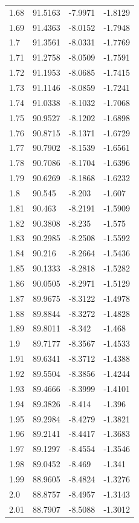 \begin{tabular}{llll}
1.68 & 91.5163 & -7.9971 & -1.8129 \\
1.69 & 91.4363 & -8.0152 & -1.7948 \\
1.7 & 91.3561 & -8.0331 & -1.7769 \\
1.71 & 91.2758 & -8.0509 & -1.7591 \\
1.72 & 91.1953 & -8.0685 & -1.7415 \\
1.73 & 91.1146 & -8.0859 & -1.7241 \\
1.74 & 91.0338 & -8.1032 & -1.7068 \\
1.75 & 90.9527 & -8.1202 & -1.6898 \\
1.76 & 90.8715 & -8.1371 & -1.6729 \\
1.77 & 90.7902 & -8.1539 & -1.6561 \\
1.78 & 90.7086 & -8.1704 & -1.6396 \\
1.79 & 90.6269 & -8.1868 & -1.6232 \\
1.8 & 90.545 & -8.203 & -1.607 \\
1.81 & 90.463 & -8.2191 & -1.5909 \\
1.82 & 90.3808 & -8.235 & -1.575 \\
1.83 & 90.2985 & -8.2508 & -1.5592 \\
1.84 & 90.216 & -8.2664 & -1.5436 \\
1.85 & 90.1333 & -8.2818 & -1.5282 \\
1.86 & 90.0505 & -8.2971 & -1.5129 \\
1.87 & 89.9675 & -8.3122 & -1.4978 \\
1.88 & 89.8844 & -8.3272 & -1.4828 \\
1.89 & 89.8011 & -8.342 & -1.468 \\
1.9 & 89.7177 & -8.3567 & -1.4533 \\
1.91 & 89.6341 & -8.3712 & -1.4388 \\
1.92 & 89.5504 & -8.3856 & -1.4244 \\
1.93 & 89.4666 & -8.3999 & -1.4101 \\
1.94 & 89.3826 & -8.414 & -1.396 \\
1.95 & 89.2984 & -8.4279 & -1.3821 \\
1.96 & 89.2141 & -8.4417 & -1.3683 \\
1.97 & 89.1297 & -8.4554 & -1.3546 \\
1.98 & 89.0452 & -8.469 & -1.341 \\
1.99 & 88.9605 & -8.4824 & -1.3276 \\
2.0 & 88.8757 & -8.4957 & -1.3143 \\
2.01 & 88.7907 & -8.5088 & -1.3012 \\

\end{tabular}
